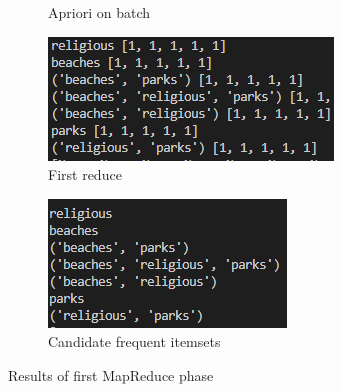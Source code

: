 \documentclass[a4paper]{article}
\begin{document}
\begin{figure}[h]
\begin{subfigure}[b]{0.24\textwidth}
         	\caption{Apriori on batch}
         	\label{fig:apriori}
		\end{subfigure}
		\hfill
		\begin{subfigure}[b]{0.24\textwidth}
			\centering
			\includegraphics[width=\textwidth]{grouped.PNG}
         	\caption{First reduce}
         	\label{fig:grouped}
		\end{subfigure}
		\hfill
		\begin{subfigure}[b]{0.24\textwidth}
			\centering
			\includegraphics[width=\textwidth]{candidates.PNG}
         	\caption{Candidate frequent itemsets}
         	\label{fig:candidate_fi}
		\end{subfigure}
	\caption{Results of first MapReduce phase}
	\end{figure}
	
\end{document}
